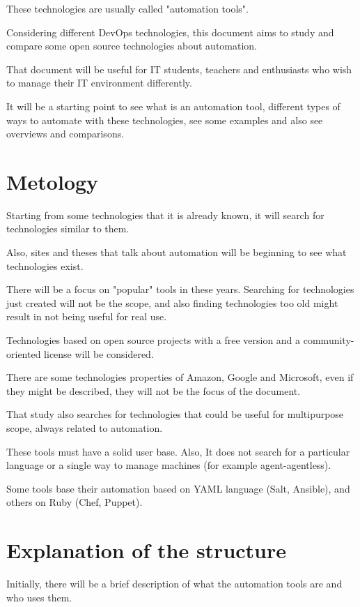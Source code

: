 \documentclass[12pt,a4paper,openright,twoside]{book}
\begin{document}
These technologies are usually called "automation tools".

Considering different DevOps technologies, this document aims to study and compare some open source technologies about automation.

That document will be useful for IT students, teachers and enthusiasts who wish to manage their IT environment differently.

It will be a starting point to see what is an automation tool, different types of ways to automate with these technologies, see some examples and also see overviews and comparisons.

\section{Metology}
Starting from some technologies that it is already known, it will search for technologies similar to them.


Also, sites and theses that talk about automation will be beginning to see what technologies exist.


There will be a focus on "popular" tools in these years. Searching for technologies just created will not be the scope, and also finding technologies too old might result in not being useful for real use.


Technologies based on open source projects with a free version and a community-oriented license will be considered.


There are some technologies properties of Amazon, Google and Microsoft, even if they might be described, they will not be the focus of the document.


That study also searches for technologies that could be useful for multipurpose scope, always related to automation.


%
%
These tools must have a solid user base. Also, It does not search for a particular language or a single way to manage machines (for example agent-agentless).


Some tools base their automation based on YAML language (Salt, Ansible), and others on Ruby (Chef, Puppet).

\section{Explanation of the structure}
Initially, there will be a brief description of what the automation tools are and who uses them.
\end{document}
